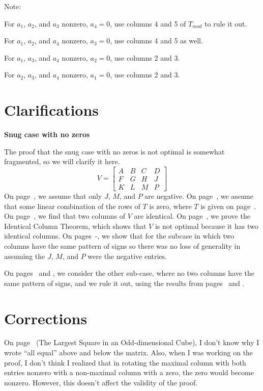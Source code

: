 Note:

For $a_1$, $a_2$, and $a_3$ nonzero, $a_4 = 0$, use columns 4 and 5 of $T_{mod}$
to rule it out.

For $a_1$, $a_2$, and $a_4$ nonzero, $a_3 = 0$, use columns 4 and 5 as well.

For $a_1$, $a_3$, and $a_4$ nonzero, $a_2 = 0$, use columns 2 and 3.

For $a_2$, $a_3$, and $a_4$ nonzero, $a_1 = 0$, use columns 2 and 3.
\newpage

\section{Clarifications}
\begin{center}
{\bf Snug case with no zeros}
\end{center}
\vspace{-0.1in}
The proof that the snug case with no zeros is not optimal is somewhat
fragmented, so we will clarify it here.
\begin{equation*}
V =
\begin{bmatrix}
A & B & C & D \\
F & G & H & J \\
K & L & M & P
\end{bmatrix}
\end{equation*}
On page~\pageref{refpage8}, we assume that only $J$, $M$, and $P$ are
negative.  On page~\pageref{refpage9}, we assume that some linear combination
of the rows of $T$ is zero, where $T$ is given on page~\pageref{refpage10}.
On page~\pageref{refpage11}, we find that two columns of $V$ are identical.
On page~\pageref{refpage12}, we prove the
Identical Column Theorem, which shows that $V$ is not optimal because it has
two identical columns.  On
pages~\pageref{refpage13start}-\pageref{refpage13end}, we show that for the
subcase in which two columns have the same pattern of signs so there was no
loss of generality in assuming the $J$, $M$, and $P$ were the negative
entries.

On pages~\pageref{refpage14} and \pageref{refpage15}, we consider the other
sub-case, where no two columns have the same pattern of signs, and we rule it
out, using the results from pages~\pageref{refpage16} and \pageref{refpage17}.
\newpage

\section{Corrections}
On page~\pageref{refpage18} (The Largest Square in an Odd-dimensional Cube),
I don't know why I wrote ``all equal'' above and below the matrix.  Also, when
I was working on the proof, I don't think I realized that in rotating the
maximal column with both entries nonzero with a non-maximal column with a
zero, the zero would become nonzero.  However, this doesn't affect the
validity of the proof.

